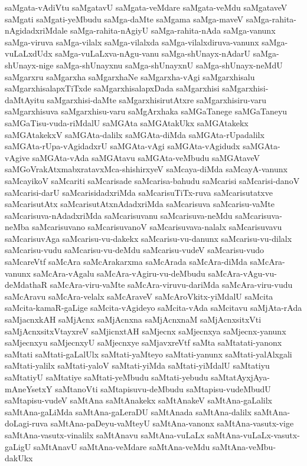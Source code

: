 {saMgata-vAdiVtu
saMgatavU
saMgata-veMdare
saMgata-veMdu
saMgataveV
saMgati
saMgati-yeMbudu
saMga-daMte
saMgama
saMga-maveV
saMga-rahita-nAgidadxriMdale
saMga-rahita-nAgiyU
saMga-rahita-nAda
saMga-vanunx
saMga-viruva
saMga-vilalx
saMga-vilalxda
saMga-vilalxdiruva-vanunx
saMga-vuLaLxdUdx
saMga-vuLaLxva-nAgu-vanu
saMga-shUnayx-nAdarU
saMga-shUnayx-nige
saMga-shUnayxnu
saMga-shUnayxnU
saMga-shUnayx-neMdU
saMgarxru
saMgarxha
saMgarxhaNe
saMgarxha-vAgi
saMgarxhisalu
saMgarxhisalapxTiTxde
saMgarxhisalapxDada
saMgarxhisi
saMgarxhisi-daMtAyitu
saMgarxhisi-daMte
saMgarxhisirutAtxre
saMgarxhisiru-varu
saMgarxhisuva
saMgarxhisu-varu
saMgArxhaka
saMGaTanege
saMGaTaneyu
saMGaTisu-vuda-riMdalU
saMGAta
saMGAtakUkx
saMGAtakekx
saMGAtakekxV
saMGAta-dalilx
saMGAta-diMda
saMGAta-rUpadalilx
saMGAta-rUpa-vAgidadxrU
saMGAta-vAgi
saMGAta-vAgidudx
saMGAta-vAgive
saMGAta-vAda
saMGAtavu
saMGAta-veMbudu
saMGAtaveV
saMGoVrakAtxmabxratavxMca-shishirxyeV
saMcaya-diMda
saMcayA-vanunx
saMcayikoV
saMcariti
saMcarisade
saMcarisa-bahudu
saMcarisi
saMcarisi-danoV
saMcarisi-darU
saMcarisidadxriMda
saMcarisuTiTx-ruva
saMcarisutatxve
saMcarisutAtx
saMcarisutAtxnAdadxriMda
saMcarisuva
saMcarisu-vaMte
saMcarisuva-nAdadxriMda
saMcarisuvanu
saMcarisuva-neMdu
saMcarisuva-neMba
saMcarisuvano
saMcarisuvanoV
saMcarisuvava-nalalx
saMcarisuvavu
saMcarisuvAga
saMcarisu-vu-dakekx
saMcarisu-vu-danunx
saMcarisu-vu-dilalx
saMcarisu-vudu
saMcarisu-vu-deMdu
saMcarisu-vudeV
saMcarisu-vudo
saMcareVtf
saMcAra
saMcArakarxma
saMcArada
saMcAra-diMda
saMcAra-vanunx
saMcAra-vAgalu
saMcAra-vAgiru-vu-deMbudu
saMcAra-vAgu-vu-deMdathaR
saMcAra-viru-vaMte
saMcAra-viruvu-dariMda
saMcAra-viru-vudu
saMcAravu
saMcAra-velalx
saMcAraveV
saMcAroVkitx-yiMdalU
saMcita
saMcita-kamaR-gaLige
saMcita-vAgideyo
saMcita-vAda
saMcitavu
saMjAta-rAda
saMjacnxkAH
saMjAcnx
saMjAcnxna
saMjAcnxnaM
saMjAcnxsitxVti
saMjAcnxsitxVtayxreV
saMjicnxtAH
saMjecnx
saMjecnxya
saMjecnx-yanunx
saMjecnxyu
saMjecnxyU
saMjecnxye
saMjavxreVtf
saMta
saMtatati-yanonx
saMtati
saMtati-gaLalUlx
saMtati-yaMteyo
saMtati-yanunx
saMtati-yalAlxgali
saMtati-yalilx
saMtati-yaloV
saMtati-yiMda
saMtati-yiMdalU
saMtatiyu
saMtatiyU
saMtatiye
saMtati-yeMbudu
saMtati-yebudu
saMtatAyxjAya-mAneYsetxY
saMtanoVti
saMtapisuvu-deMbudu
saMtapisu-vudeMbudU
saMtapisu-vudeV
saMtAna
saMtAnakekx
saMtAnakeV
saMtAna-gaLalilx
saMtAna-gaLiMda
saMtAna-gaLeraDU
saMtAnada
saMtAna-dalilx
saMtAna-doLagi-ruva
saMtAna-paDeyu-vaMteyU
saMtAna-vanonx
saMtAna-vasutx-vige
saMtAna-vasutx-vinalilx
saMtAnavu
saMtAna-vuLaLx
saMtAna-vuLaLx-vasutx-gaLigU
saMtAnavU
saMtAna-veMdare
saMtAna-veMdu
saMtAna-veMbu-dakUkx
}
